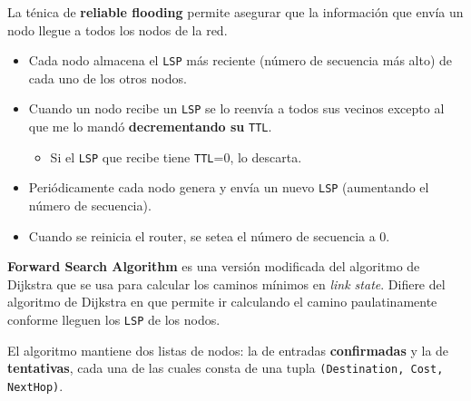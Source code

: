 \documentclass[]{article}
\begin{document}
La ténica de \textbf{reliable flooding} permite asegurar que la información que envía un nodo llegue a todos los nodos de la red.

\begin{itemize}
    \item Cada nodo almacena el \texttt{LSP} más reciente (número de secuencia más alto) de cada uno de los otros nodos.
    \item Cuando un nodo recibe un \texttt{LSP} se lo reenvía a todos sus vecinos excepto al que me lo mandó \textbf{decrementando su } \texttt{TTL}.
    \begin{itemize}
        \item Si el \texttt{LSP} que recibe tiene \texttt{TTL}=0, lo descarta.
    \end{itemize}
    \item Periódicamente cada nodo genera y envía un nuevo \texttt{LSP} (aumentando el número de secuencia).
    \item Cuando se reinicia el router, se setea el número de secuencia a 0.
\end{itemize}


\textbf{Forward Search Algorithm} es una versión modificada del algoritmo de Dijkstra que se usa para calcular los caminos mínimos en \emph{link state}. Difiere del algoritmo de Dijkstra en que permite ir calculando el camino paulatinamente conforme lleguen los \texttt{LSP} de los nodos.

El algoritmo mantiene dos listas de nodos: la de entradas \textbf{confirmadas} y la de \textbf{tentativas}, cada una de las cuales consta de una tupla \texttt{(Destination, Cost, NextHop)}.







\end{document}
